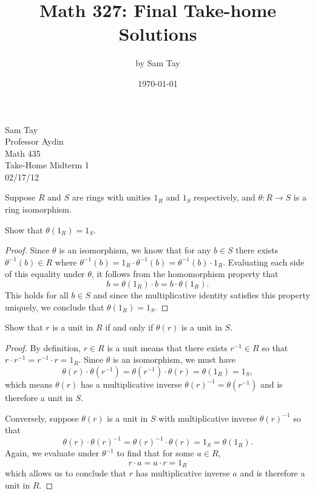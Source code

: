 \documentclass{article}
\title{Math 327: Final Take-home Solutions}
\author{by Sam Tay}
\date{\today}
\newenvironment{problem2}[1]{\noindent {\bf (#1}}
{\medskip}
\newenvironment{problem1}[1]{\noindent {\bf Problem #1:}}
{\medskip}
\begin{document}
\begin{flushright}Sam Tay\\ Professor Aydin \\ Math 435 \\ Take-Home Midterm 1\\ 02/17/12
\end{flushright}
\vspace{.7cm}

\begin{problem1}{1} Suppose $R$ and $S$ are rings with unities $1_R$ and $1_S$ respectively, and $\theta:R\to S$ is a ring isomorphism.
\end{problem1}

\begin{problem2}{a)} Show that $\theta(1_R)=1_S$.
\begin{proof} Since $\theta$ is an isomorphism, we know that for any $b\in S$ there exists $\theta^{-1}(b)\in R$ where $\theta^{-1}(b)=1_R\cdot \theta^{-1}(b) = \theta^{-1}(b) \cdot 1_R$. Evaluating each side of this equality under $\theta$, it follows from the homomorphism property that $$b=\theta(1_R)\cdot b = b\cdot\theta(1_R).$$ This holds for all $b\in S$ and since the multiplicative identity satisfies this property uniquely, we conclude that $\theta(1_R)=1_S$.
\end{proof}
\end{problem2}
\begin{problem2}{b)} Show that $r$ is a unit in $R$ if and only if $\theta(r)$ is a unit in $S$.
\begin{proof} By definition, $r\in R$ is a unit means that there exists $r^{-1}\in R$ so that $r\cdot r^{-1}=r^{-1}\cdot r = 1_R$. Since $\theta$ is an isomorphism, we must have $$\theta(r)\cdot\theta(r^{-1})=\theta(r^{-1})\cdot\theta(r)=\theta(1_R)=1_S,$$ which means $\theta(r)$ has a multiplicative inverse $\theta(r)^{-1}=\theta(r^{-1})$ and is therefore a unit in $S$.

Conversely, suppose $\theta(r)$ is a unit in $S$ with multiplicative inverse $\theta(r)^{-1}$ so that $$\theta(r)\cdot\theta(r)^{-1}=\theta(r)^{-1}\cdot\theta(r)=1_S=\theta(1_R).$$ Again, we evaluate under $\theta^{-1}$ to find that for some $a\in R$, $$r\cdot a =a\cdot r=1_R$$ which allows us to conclude that $r$ has multiplicative inverse $a$ and is therefore a unit in $R$.
\end{proof}
\end{problem2}
\end{document}
